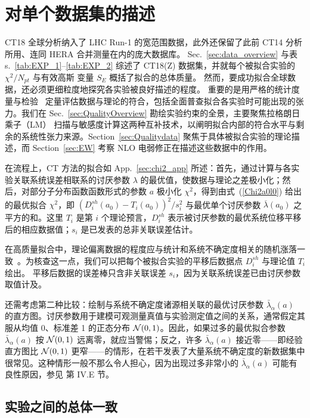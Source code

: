 \section{对单个数据集的描述}
\label{sec:Quality}

CT18 全球分析纳入了 LHC Run-1 的宽范围数据，此外还保留了此前 CT14 分析所用、连同 HERA 合并测量在内的庞大数据库。
Sec.~\ref{sec:data_overview} 与表s.~\ref{tab:EXP_1}--\ref{tab:EXP_2}
综述了 CT18(Z) 数据集，并就每个被拟合实验的 $\chi^2/N_\mathit{pt}$ 与有效高斯
变量 $S_E$ 概括了拟合的总体质量。
然而，要成功拟合全球数据，还必须更细粒度地探究各实验被良好描述的程度。
重要的是用严格的统计度量与检验~\cite{Kovarik:2019xvh} 定量评估数据与理论的符合，包括全面普查拟合各实验时可能出现的张力。我们在 Sec.~\ref{sec:QualityOverview} 勘绘实验约束的全景，主要聚焦拉格朗日乘子（LM）
扫描与敏感度计算这两种互补技术，以阐明拟合内部的符合水平与剩余的系统性张力来源。Section~\ref{sec:Qualitydata} 聚焦于具体被拟合实验的理论描述，而 Section~\ref{sec:EW} 考察 NLO 电弱修正在描述这些数据中的作用。

在流程上，CT 方法的拟合如 App.~\ref{sec:chi2_app} 所述：首先，通过计算与各实验关联系统误差相联系的讨厌参数 $\lambda$ 的最优值，使数据与理论之差极小化；然后，对部分子分布函数函数形式的参数 $a$ 极小化 $\chi^{2}$，得到由式~(\ref{Chi2a0l0}) 给出的最优拟合 $\chi^{2}$，即 $(D^\mathit{sh}_{i}(a_0)-T_{i}(a_0))^{2}/s_{i}^{2}$ 与最优单个讨厌参数 $\overline \lambda (a_0)$ 之平方的和。这里 $T_i$ 是第 $i$ 个理论预言，$D^\mathit{sh}_{i}$ 表示被讨厌参数的最优系统位移平移后的相应数据值；$s_{i}$ 是已发表的总非关联误差估计。

在高质量拟合中，理论偏离数据的程度应与统计和系统不确定度相关的随机涨落一致~\cite{Kovarik:2019xvh}。为核查这一点，我们可以把每个被拟合实验的平移后数据点 $D^\mathit{sh}_{i}$ 与理论值
$T_{i}$ 绘出。
平移后数据的误差棒只含非关联误差
$s_{i}$，因为关联系统误差已由讨厌参数取值计及。

还需考虑第二种比较：绘制与系统不确定度诸源相关联的最优讨厌参数 $\bar \lambda_\alpha(a)$ 的直方图。讨厌参数用于建模可观测量真值与实验测定值之间的关系，通常假定其服从均值 0、标准差 1 的正态分布 ${\cal N}(0,1)$。因此，如果过多的最优拟合参数 $\bar \lambda_\alpha(a)$ 按 ${\cal N}(0,1)$ 远离零，就应当警惕；反之，许多 $\bar \lambda_\alpha(a)$ 接近零——即经验直方图比 ${\cal N}(0,1)$ 更窄——的情形，在若干发表了大量系统不确定度的新数据集中很常见。这种情形一般不那么令人担心，因为出现过多非常小的 $\bar \lambda_\alpha(a)$ 可能有良性原因，参见 \cite{Kovarik:2019xvh} 第 IV.E 节。


\subsection{实验之间的总体一致 \label{sec:QualityOverview}}

